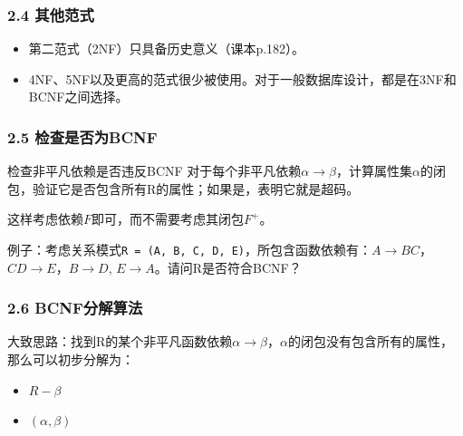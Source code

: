 \documentclass[aspectratio=169, 14pt]{beamer}
\begin{document}
\begin{frame}
	\frametitle{2.4 其他范式}
	\begin{itemize}
		\item 第二范式（2NF）只具备历史意义（课本p.182）。
		\item 4NF、5NF以及更高的范式很少被使用。对于一般数据库设计，\alert{都是在3NF和BCNF之间选择。}
	\end{itemize}


\end{frame}

\begin{frame}
	\frametitle{2.5 检查是否为BCNF}
	\begin{exampleblock}{检查非平凡依赖是否违反BCNF}
		对于每个非平凡依赖$\alpha \rightarrow \beta$，计算属性集$\alpha$的闭包，验证它是否包含所有R的属性；如果是，表明它就是超码。
	\end{exampleblock}
	这样考虑依赖$F$即可，而不需要考虑其闭包$F^+$。

	\pause
	 例子：考虑关系模式\texttt{R = (A, B, C, D, E)}，所包含函数依赖有：$A \rightarrow BC$，$CD \rightarrow E$，$B \rightarrow D$, $E \rightarrow A$。请问R是否符合BCNF？

\end{frame}

\begin{frame}
	\frametitle{2.6 BCNF分解算法}
	大致思路：找到R的某个非平凡函数依赖$\alpha \rightarrow \beta$，$\alpha$的闭包没有包含所有的属性，那么可以初步分解为：

	\begin{itemize}
		\item $R - \beta$
		\item $(\alpha, \beta)$
	\end{itemize}

\end{frame}

\begin{frame}
\end{frame}
\end{document}
